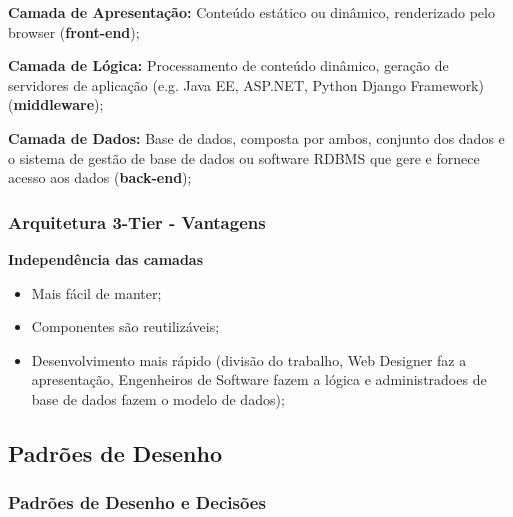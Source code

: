 \documentclass{article}
\begin{document}
\begin{flushleft}
  \textbf{Camada de Apresentação:} Conteúdo estático ou dinâmico, renderizado pelo browser (\textbf{front-end});
  
  \textbf{Camada de Lógica:} Processamento de conteúdo dinâmico, geração de servidores de aplicação
  (e.g. Java EE, ASP.NET, Python Django Framework) (\textbf{middleware});
  
  \textbf{Camada de Dados:} Base de dados, composta por ambos, conjunto dos dados e o sistema de gestão de base de dados
  ou software RDBMS que gere e fornece acesso aos dados (\textbf{back-end});
\end{flushleft}

\pagebreak

\subsubsection{Arquitetura 3-Tier - Vantagens}

\begin{flushleft}
  \textbf{Independência das camadas}
  \begin{itemize}
    \item Mais fácil de manter;
    \item Componentes são reutilizáveis;
    \item Desenvolvimento mais rápido (divisão do trabalho, 
    Web Designer faz a apresentação, Engenheiros de Software fazem a lógica
    e administradoes de base de dados fazem o modelo de dados);
  \end{itemize}
\end{flushleft}

\subsection{Padrões de Desenho}

\subsubsection{Padrões de Desenho e Decisões}
\end{document}
